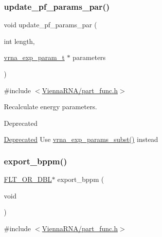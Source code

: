 \subsubsection{\texorpdfstring{update\+\_\+pf\+\_\+params\+\_\+par()}{update\_pf\_params\_par()}}
{\footnotesize\ttfamily void update\+\_\+pf\+\_\+params\+\_\+par (\begin{DoxyParamCaption}\item[{int}]{length,  }\item[{\hyperlink{group__energy__parameters_ga01d8b92fe734df8d79a6169482c7d8d8}{vrna\+\_\+exp\+\_\+param\+\_\+t} $\ast$}]{parameters }\end{DoxyParamCaption})}



{\ttfamily \#include $<$\hyperlink{part__func_8h}{Vienna\+R\+N\+A/part\+\_\+func.\+h}$>$}



Recalculate energy parameters. 

\begin{DoxyRefDesc}{Deprecated}
\item[\hyperlink{deprecated__deprecated000108}{Deprecated}]Use \hyperlink{group__energy__parameters_ga8e7ac4fab3b0cc03afbc134eaafb3525}{vrna\+\_\+exp\+\_\+params\+\_\+subst()} instead\end{DoxyRefDesc}
\mbox{\label{group__pf__fold_gac5ac7ee281aae1c5cc5898a841178073}} 
\subsubsection{\texorpdfstring{export\+\_\+bppm()}{export\_bppm()}}
{\footnotesize\ttfamily \hyperlink{group__data__structures_ga31125aeace516926bf7f251f759b6126}{F\+L\+T\+\_\+\+O\+R\+\_\+\+D\+BL}$\ast$ export\+\_\+bppm (\begin{DoxyParamCaption}\item[{void}]{ }\end{DoxyParamCaption})}



{\ttfamily \#include $<$\hyperlink{part__func_8h}{Vienna\+R\+N\+A/part\+\_\+func.\+h}$>$}



